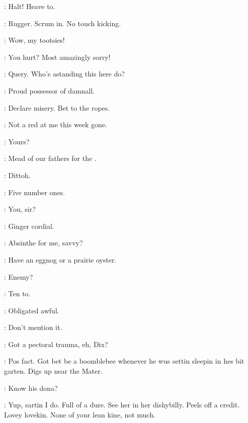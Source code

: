 \documentclass[12pt]{article}
\begin{document}


\PC: Halt! Heave to.

\Dx: Rugger. Scrum in. No touch kicking.

\Ly: Wow, my tootsies!

\Dx: You hurt? Most amazingly sorry!


\Ln: Query. Who's astanding this here do?

\Md: Proud possessor of damnall.

\Ly: Declare misery. Bet to the ropes.


\Dx: Not a red at me this week gone.

\Br: Yours?

\SD: Mead of our fathers for the .

\Ba: Dittoh.

\SD: Five number ones.

\Br: You, sir?

\Bl: Ginger cordial.





\SD: Absinthe for me, savvy?

\Mu:  Have an eggnog or a prairie oyster.

\Bl: Enemy?


\Md: Ten to.

\Bl: Obligated awful.

\Md: Don't mention it.

\Ly: Got a pectoral trauma, eh, Dix?

\Dx: Pos fact. Got bet be a boomblebee whenever he wus
settin sleepin in hes bit garten.
Digs up near the Mater.


\Mu: Know his dona?

\Dx: Yup, sartin I do. Full of a dure. See her in her dishybilly.
Peels off a credit. Lovey lovekin. None of your lean kine, not much.

\end{document}
